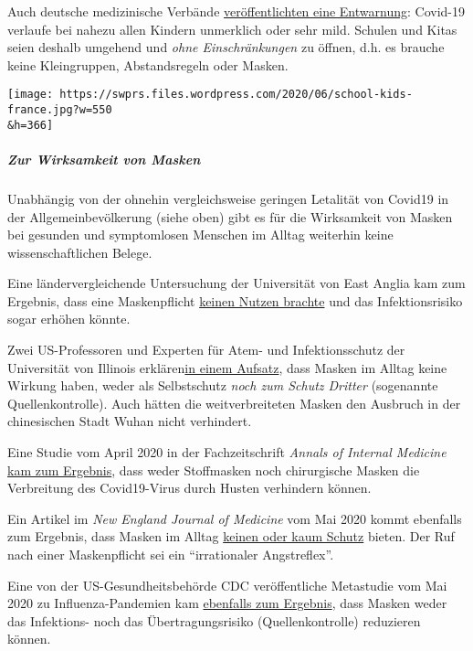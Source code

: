 Auch deutsche medizinische Verbände
\href{https://www.welt.de/politik/deutschland/article208075525/Corona-Kitas-und-Grundschulen-vollstaendig-oeffnen-uneingeschraenkt.html}{veröffentlichten
eine Entwarnung}: Covid-19 verlaufe bei nahezu allen Kindern unmerklich
oder sehr mild. Schulen und Kitas seien deshalb umgehend und \emph{ohne
Einschränkungen} zu öffnen, d.h. es brauche keine Kleingruppen,
Abstandsregeln oder Masken.

\texttt{[image: https://swprs.files.wordpress.com/2020/06/school-kids-france.jpg?w=550\\\&h=366]}

\hypertarget{zur-wirksamkeit-von-masken-2}{%
\subparagraph{\texorpdfstring{\textbf{Zur Wirksamkeit von
Masken}}{Zur Wirksamkeit von Masken}}\label{zur-wirksamkeit-von-masken-2}}

Unabhängig von der ohnehin vergleichsweise geringen Letalität von
Covid19 in der Allgemein­bevölkerung (siehe oben) gibt es für die
Wirksamkeit von Masken bei gesunden und symptomlosen Menschen im Alltag
weiterhin keine wissenschaftlichen Belege.

Eine ländervergleichende Untersuchung der Universität von East Anglia
kam zum Ergebnis, dass eine Maskenpflicht
\href{https://www.uea.ac.uk/about/-/new-study-reveals-blueprint-for-getting-out-of-covid-19-lockdown}{keinen
Nutzen brachte} und das Infektionsrisiko sogar erhöhen könnte.

Zwei US-Professoren und Experten für Atem- und Infektionsschutz der
Universität von Illinois
erklären\href{https://www.cidrap.umn.edu/news-perspective/2020/04/commentary-masks-all-covid-19-not-based-sound-data}{in
einem Aufsatz}, dass Masken im Alltag keine Wirkung haben, weder als
Selbstschutz \emph{noch zum Schutz Dritter} (sogenannte
Quellenkontrolle). Auch hätten die weitverbreiteten Masken den Ausbruch
in der chinesischen Stadt Wuhan nicht verhindert.

Eine Studie vom April 2020 in der Fachzeitschrift \emph{Annals of
Internal Medicine}
\href{https://www.acpjournals.org/doi/10.7326/M20-1342}{kam zum
Ergebnis}, dass weder Stoffmasken noch chirurgische Masken die
Verbreitung des Covid19-Virus durch Husten verhindern können.

Ein Artikel im \emph{New England Journal of Medicine} vom Mai 2020 kommt
ebenfalls zum Ergebnis, dass Masken im Alltag
\href{https://www.nejm.org/doi/full/10.1056/NEJMp2006372}{keinen oder
kaum Schutz} bieten. Der Ruf nach einer Maskenpflicht sei ein
``irrationaler Angstreflex''.

Eine von der US-Gesundheitsbehörde CDC veröffentliche Metastudie vom Mai
2020 zu Influenza-Pandemien kam
\href{https://wwwnc.cdc.gov/eid/article/26/5/19-0994_article}{ebenfalls
zum Ergebnis}, dass Masken weder das Infektions- noch das
Übertragungsrisiko (Quellenkontrolle) reduzieren können.

